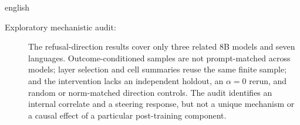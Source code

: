 \begin{otherlanguage*}{english}
\begin{description}
    \item[Exploratory mechanistic audit:] The refusal-direction results cover only three related 8B models and seven languages. Outcome-conditioned samples are not prompt-matched across models; layer selection and cell summaries reuse the same finite sample; and the intervention lacks an independent holdout, an $\alpha=0$ rerun, and random or norm-matched direction controls. The audit identifies an internal correlate and a steering response, but not a unique mechanism or a causal effect of a particular post-training component.
\end{description}

\end{otherlanguage*}
